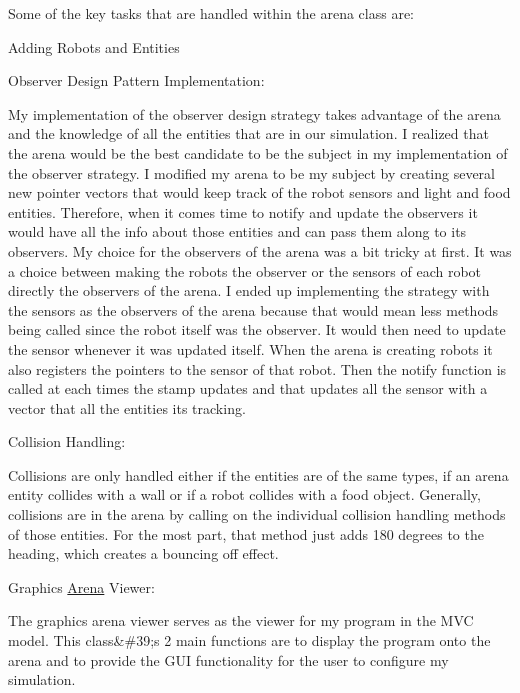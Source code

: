 Some of the key tasks that are handled within the arena class are\+:


\begin{DoxyItemize}
\item Adding Robots and Entities
\item Observer Design Pattern Implementation\+:
\begin{DoxyItemize}
\item My implementation of the observer design strategy takes advantage of the arena and the knowledge of all the entities that are in our simulation. I realized that the arena would be the best candidate to be the subject in my implementation of the observer strategy. I modified my arena to be my subject by creating several new pointer vectors that would keep track of the robot sensors and light and food entities. Therefore, when it comes time to notify and update the observers it would have all the info about those entities and can pass them along to its observers. My choice for the observers of the arena was a bit tricky at first. It was a choice between making the robots the observer or the sensors of each robot directly the observers of the arena. I ended up implementing the strategy with the sensors as the observers of the arena because that would mean less methods being called since the robot itself was the observer. It would then need to update the sensor whenever it was updated itself. When the arena is creating robots it also registers the pointers to the sensor of that robot. Then the notify function is called at each times the stamp updates and that updates all the sensor with a vector that all the entities its tracking.
\end{DoxyItemize}
\item Collision Handling\+:
\begin{DoxyItemize}
\item Collisions are only handled either if the entities are of the same types, if an arena entity collides with a wall or if a robot collides with a food object. Generally, collisions are in the arena by calling on the individual collision handling methods of those entities. For the most part, that method just adds 180 degrees to the heading, which creates a bouncing off effect.
\end{DoxyItemize}
\end{DoxyItemize}

Graphics \hyperlink{class_arena}{Arena} Viewer\+:

The graphics arena viewer serves as the viewer for my program in the M\+VC model. This class\&\#39;s 2 main functions are to display the program onto the arena and to provide the G\+UI functionality for the user to configure my simulation.


